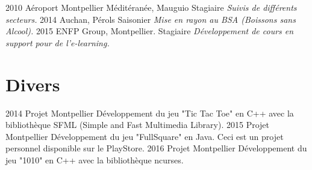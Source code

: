 \documentclass[]{friggeri-cv}
\begin{document}
\begin{entrylist}
  \entry
    {2010}
    {Aéroport Montpellier Méditéranée, Mauguio}
    {Stagiaire}
    {\emph{Suivis de différents secteurs.}}
  \entry
    {2014}
    {Auchan, Pérols}
    {Saisonier}
    {\emph{Mise en rayon au BSA (Boissons sans Alcool).}}
  \entry
    {2015}
    {ENFP Group, Montpellier.}
    {Stagiaire}
    {\emph{Développement de cours en support pour de l'e-learning.}}
\end{entrylist}

\section{Divers}


\begin{entrylist}
  \entry
    {2014}
    {Projet}
    {Montpellier}
    {Développement du jeu "Tic Tac Toe" en C++ avec la bibliothèque SFML (Simple and Fast Multimedia Library).}
  \entry
    {2015}
    {Projet}
    {Montpellier}
    {Développement du jeu "FullSquare" en Java. Ceci est un projet personnel disponible sur le PlayStore.}
  \entry
    {2016}
    {Projet}
    {Montpellier}
    {Développement du jeu "1010" en C++ avec la bibliothèque ncurses.}
\end{entrylist}



% 
\end{document}

